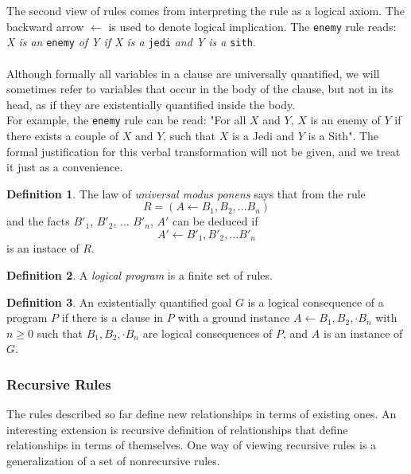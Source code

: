 \documentclass{report}
\theoremstyle{definition}
\theoremstyle{definition}
\newtheorem*{definition*}{Definition}
\newcommand{\ttt}[1]{\texttt{#1}}
\begin{document}
The second view of rules comes from interpreting the rule as a logical axiom. The backward arrow $\leftarrow$ is used to denote logical implication. The \ttt{enemy} rule reads: \textit{X is an} \ttt{enemy} \textit{of Y if X is a} \ttt{jedi} \textit{and Y is a} \ttt{sith}.\\\\
Although formally all variables in a clause are universally quantified, we will sometimes refer to variables that occur in the body of the clause, but not in its head, as if they are existentially quantified inside the body.\\

For example, the \ttt{enemy} rule can be read: "For all $X$ and $Y$, $X$ is an enemy of $Y$ if there exists a couple of $X$ and $Y$, such that $X$ is a Jedi and $Y$ is a Sith". The formal justification for this verbal transformation will not be given, and we treat it just as a convenience.
\begin{definition*}
	The law of \textit{universal modus ponens} says that from the rule $$R = (A \leftarrow B_1, B_2, \dots B_n)$$ and the facts $B'_1$, $B'_2$, $\dots$ $B'_n$, $A'$ can be deduced if  $$A' \leftarrow B'_1, B'_2, \dots B'_n$$ is an instace of $R$.
\end{definition*}
\begin{definition*}
	A \textit{logical program} is a finite set of rules.
\end{definition*}
\begin{definition*}
	An existentially quantified goal $G$ is a logical consequence of a program $P$ if there is a clause in $P$ with a ground instance $A \leftarrow B_1, B_2, \cdot B_n$ with $n \geq 0$ such that $B_1, B_2, \cdot B_n$ are logical consequences of $P$, and $A$ is an instance of $G$.
\end{definition*}
\pagebreak
\subsubsection{Recursive Rules}
The rules described so far define new relationships in terms of existing ones. An interesting extension is recursive definition of relationships that define relationships in terms of themselves. One way of viewing recursive rules is a generalization of a set of nonrecursive rules.\\
\end{document}
